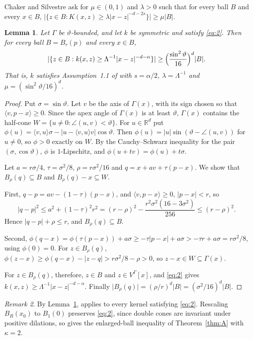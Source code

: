 \documentclass[11pt]{amsart}
\newtheorem{lemma}{Lemma}
\theoremstyle{remark}
\newtheorem{remark}[lemma]{Remark}
\newcommand{\R}{\mathbb{R}}
\newcommand{\abs}[1]{\lvert #1\rvert}
\newcommand{\norm}[1]{\lvert #1\rvert}
\newcommand{\1}{\mathbf{1}}
\begin{document}
Chaker and Silvestre \cite[Assumption~1.1]{CS} ask for $\mu\in(0,1)$ and $\lambda>0$ such that
for every ball $B$ and every $x\in B$,
$\abs{\{z\in B:K(x,z)\ge\lambda\norm{x-z}^{-d-2s}\}}\ge\mu\abs B$.

\begin{lemma}\label{lem:cs}
Let $\Gamma$ be $\vartheta$-bounded, and let $k$ be symmetric and satisfy \eqref{eq:2}. Then for
every ball $B=B_r(p)$ and every $x\in B$,
\[
  \abs{\{z\in B:k(x,z)\ge\Lambda^{-1}\norm{x-z}^{-d-\alpha}\}}\ge\Bigl(\frac{\sin^2\vartheta}{16}\Bigr)^d\abs B .
\]
That is, $k$ satisfies Assumption~1.1 of \cite{CS} with $s=\alpha/2$, $\lambda=\Lambda^{-1}$ and
$\mu=(\sin^2\vartheta/16)^d$.
\end{lemma}

\begin{proof}
Put $\sigma=\sin\vartheta$. Let $v$ be the axis of $\Gamma(x)$, with its sign chosen so that
$\langle v,p-x\rangle\ge0$. Since the apex angle of $\Gamma(x)$ is at least $\vartheta$, $\Gamma(x)$
contains the half-cone $W=\{u\ne0:\angle(u,v)<\vartheta\}$. For $u\in\R^d$ put
$\phi(u)=\langle v,u\rangle\sigma-\norm{u-\langle v,u\rangle v}\cos\vartheta$. Then
$\phi(u)=\norm u\sin(\vartheta-\angle(u,v))$ for $u\ne0$, so $\phi>0$ exactly on $W$. By the
Cauchy--Schwarz inequality for the pair $(\sigma,\cos\vartheta)$, $\phi$ is $1$-Lipschitz, and
$\phi(u+tv)=\phi(u)+t\sigma$.

Let $a=r\sigma/4$, $\tau=\sigma^2/8$, $\rho=r\sigma^2/16$ and
$q=x+av+\tau(p-x)$. We show that $B_\rho(q)\subseteq B$ and $B_\rho(q)-x\subseteq W$.

First, $q-p=av-(1-\tau)(p-x)$, and $\langle v,p-x\rangle\ge0$, $\norm{p-x}<r$, so
\[
  \norm{q-p}^2\le a^2+(1-\tau)^2r^2=(r-\rho)^2-\frac{r^2\sigma^2(16-3\sigma^2)}{256}\le(r-\rho)^2 .
\]
Hence $\norm{q-p}+\rho\le r$, and $B_\rho(q)\subseteq B$.

Second, $\phi(q-x)=\phi(\tau(p-x))+a\sigma\ge-\tau\norm{p-x}+a\sigma>-\tau r+a\sigma
=r\sigma^2/8$, using $\phi(0)=0$. For $z\in B_\rho(q)$, $\phi(z-x)\ge \phi(q-x)-\norm{z-q}>r\sigma^2/8-\rho>0$,
so $z-x\in W\subseteq\Gamma(x)$.

For $z\in B_\rho(q)$, therefore, $z\in B$ and $z\in V^\Gamma[x]$, and \eqref{eq:2} gives
$k(x,z)\ge\Lambda^{-1}\norm{x-z}^{-d-\alpha}$. Finally $\abs{B_\rho(q)}=(\rho/r)^d\abs B
=(\sigma^2/16)^d\abs B$.
\end{proof}

\begin{remark}\label{rem:cs}
By Lemma~\ref{lem:cs}, \cite[Theorem~1.3]{CS} applies to every kernel satisfying \eqref{eq:2}.
Rescaling $B_R(x_0)$ to $B_1(0)$ preserves \eqref{eq:2}, since double cones are invariant under
positive dilations, so \cite[Theorem~1.3]{CS} gives the enlarged-ball inequality of
Theorem~\ref{thm:A} with $\kappa=2$.
\end{remark}
\end{document}
